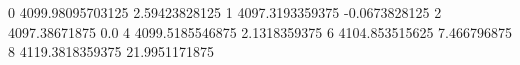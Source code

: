 0 4099.98095703125 2.59423828125
1 4097.3193359375 -0.0673828125
2 4097.38671875 0.0
4 4099.5185546875 2.1318359375
6 4104.853515625 7.466796875
8 4119.3818359375 21.9951171875
